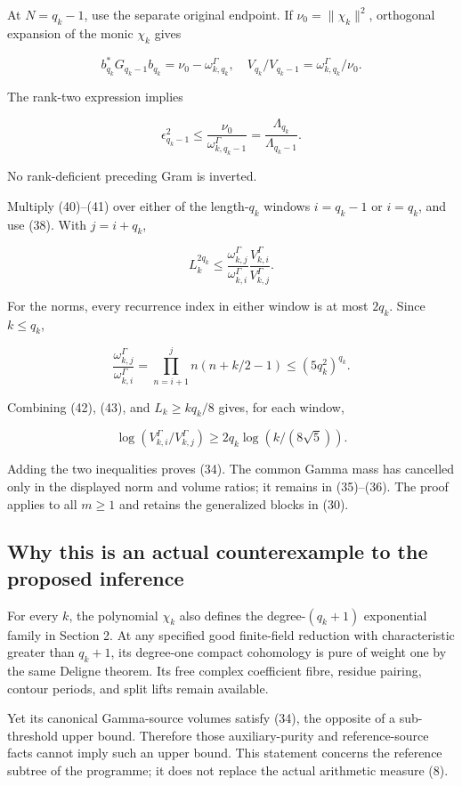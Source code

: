 \documentclass[
  11pt,
]{article}
\begin{document}
At \(N=q_k-1\), use the separate original endpoint. If
\(\nu_0=\|\chi_k\|^2\), orthogonal expansion of the monic \(\chi_k\)
gives

\[
b_{q_k}^*G_{q_k-1}b_{q_k}=\nu_0-\omega_{k,q_k}^\Gamma,
\quad
V_{q_k}/V_{q_k-1}=\omega_{k,q_k}^\Gamma/\nu_0.
\]

The rank-two expression implies

\[
\epsilon_{q_k-1}^2\le
\frac{\nu_0}{\omega_{k,q_k-1}^\Gamma}
=\frac{\Lambda_{q_k}}{\Lambda_{q_k-1}}.
\tag{41}
\]

No rank-deficient preceding Gram is inverted.

Multiply (40)--(41) over either of the length-\(q_k\) windows
\(i=q_k-1\) or \(i=q_k\), and use (38). With \(j=i+q_k\),

\[
L_k^{2q_k}\le\frac{\omega_{k,j}^\Gamma}{\omega_{k,i}^\Gamma}
\frac{V_{k,i}^\Gamma}{V_{k,j}^\Gamma}.
\tag{42}
\]

For the norms, every recurrence index in either window is at most
\(2q_k\). Since \(k\le q_k\),

\[
\frac{\omega_{k,j}^\Gamma}{\omega_{k,i}^\Gamma}
=\prod_{n=i+1}^{j}n(n+k/2-1)
\le(5q_k^2)^{q_k}.
\tag{43}
\]

Combining (42), (43), and \(L_k\ge kq_k/8\) gives, for each window,

\[
\log(V_{k,i}^\Gamma/V_{k,j}^\Gamma)
\ge2q_k\log(k/(8\sqrt5)).
\]

Adding the two inequalities proves (34). The common Gamma mass has
cancelled only in the displayed norm and volume ratios; it remains in
(35)--(36). The proof applies to all \(m\ge1\) and retains the
generalized blocks in (30).

\subsection{Why this is an actual counterexample to the proposed
inference}\label{why-this-is-an-actual-counterexample-to-the-proposed-inference}

For every \(k\), the polynomial \(\chi_k\) also defines the
degree-\((q_k+1)\) exponential family in Section 2. At any specified
good finite-field reduction with characteristic greater than \(q_k+1\),
its degree-one compact cohomology is pure of weight one by the same
Deligne theorem. Its free complex coefficient fibre, residue pairing,
contour periods, and split lifts remain available.

Yet its canonical Gamma-source volumes satisfy (34), the opposite of a
sub-threshold upper bound. Therefore those auxiliary-purity and
reference-source facts cannot imply such an upper bound. This statement
concerns the reference subtree of the programme; it does not replace the
actual arithmetic measure (8).
\end{document}
